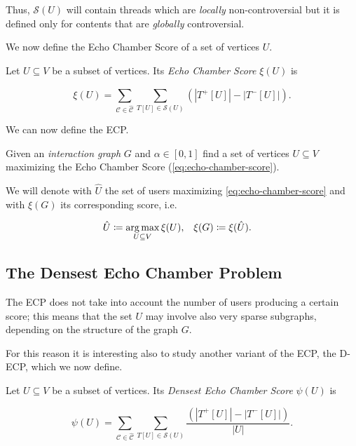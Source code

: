 Thus, $\mathcal{S} (U)$ will contain threads which are \emph{locally}
non-controversial but it is defined only for contents that are \emph{globally}
controversial.

\medskip

We now define the Echo Chamber Score of a set of vertices $U$.

\begin{definition}
	Let $U \subseteq V$ be a subset of vertices. Its \emph{Echo Chamber Score}
	$\xi(U)$ is

	\begin{equation}
		\label{eq:echo-chamber-score}
		\xi(U) = \sum^{}_{\mathcal{C} \in \mathcal{\hat{C}}} \sum^{}_{T[U] \in
		\mathcal{S} (U)} (|T^{+} [U]| - |T ^{-} [U]|).
	\end{equation}
\end{definition}

We can now define the \acrfull{ECP}.

\begin{problem}
Given an \emph{interaction graph} $G$ and $\alpha \in [0, 1]$ find a set of vertices $U \subseteq
	V$ maximizing the Echo Chamber Score (\autoref{eq:echo-chamber-score}).
\end{problem}

We will denote with $\hat{U}$ the set of users maximizing
\autoref{eq:echo-chamber-score} and with $\xi(G)$ its corresponding score, i.e.

\begin{align*}
	\hat{U} & \coloneqq \operatorname*{arg\,max}_{U \subseteq V} \xi(U), & \xi(G) & \coloneqq
	\xi(\hat{U}).
\end{align*}

\subsection{The Densest Echo Chamber Problem}%
\label{sub:the_densest_echo_chamber_problem}

The \acrshort{ECP} does not take into account the number of users producing a
certain score; this means that the set $U$ may involve also very sparse
subgraphs, depending on the structure of the graph $G$.

For this reason it is interesting also to study another variant of the
\acrshort{ECP}, the \acrfull{D-ECP}, which we now define.

\begin{definition}
	Let $U \subseteq V$ be a subset of vertices. Its \emph{Densest Echo Chamber Score}
	$\psi(U)$ is

	\begin{equation}
		\label{eq:densest-echo-chamber-score}
		\psi(U) = \sum^{}_{\mathcal{C} \in \mathcal{\hat{C}}} \sum^{}_{T[U] \in
		\mathcal{S} (U)} \frac{(|T^{+} [U]| - |T ^{-} [U]|)}{|U|}.
	\end{equation}
\end{definition}

